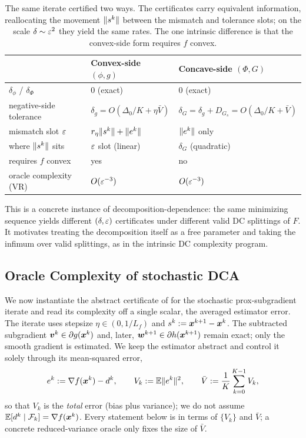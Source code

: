 \begin{table}[h]
\centering
\begin{tabular}{lll}
\toprule
 & Convex-side $(\phi,g)$ & Concave-side $(\Phi,G)$ \\
\midrule
$\delta_\phi$ / $\delta_\Phi$ & $0$ (exact) & $0$ (exact) \\
negative-side tolerance & $\delta_g=O(\Delta_0/K+\eta\bar V)$ & $\delta_G=\delta_g+D_{G_s}=O(\Delta_0/K+\bar V)$ \\
mismatch slot $\varepsilon$ & $r_\eta\lVert s^k\rVert+\lVert e^k\rVert$ & $\lVert e^k\rVert$ only \\
where $\lVert s^k\rVert$ sits & $\varepsilon$ slot (linear) & $\delta_G$ (quadratic) \\
requires $f$ convex & yes & no \\
oracle complexity (VR) & $O(\varepsilon^{-3})$ & $O(\varepsilon^{-3})$ \\
\bottomrule
\end{tabular}
\caption{The same iterate certified two ways. The certificates carry
equivalent information, reallocating the movement $\lVert s^k\rVert$ between the
mismatch and tolerance slots; on the scale $\delta\sim\varepsilon^2$ they yield
the same rates. The one intrinsic difference is that the convex-side form
requires $f$ convex.}
\end{table}

\begin{remark}
This is a concrete instance of decomposition-dependence: the same
minimizing sequence yields different $(\delta,\varepsilon)$ certificates
under different valid DC splittings of $F$. It motivates treating the
decomposition itself as a free parameter and taking the infimum over
valid splittings, as in the intrinsic DC complexity program.
\end{remark}

\subsection{Oracle Complexity of stochastic DCA}
We now instantiate the abstract certificate of
 for the stochastic prox-subgradient
iterate and read its complexity off a single scalar, the averaged
estimator error. The iterate uses stepsize $\eta\in(0,1/L_f)$ and $s^k:=\bm{x}^{k+1}-\bm{x}^k$. The
subtracted subgradient $\bm{v}^k\in\partial g(\bm{x}^k)$ and, later,
$\bm{w}^{k+1}\in\partial h(\bm{x}^{k+1})$ remain exact; only the smooth
gradient is estimated. We keep the estimator abstract and control it
solely through its mean-squared error,
\begin{equation}
    e^k:=\nabla f(\bm{x}^k)-d^k,
    \qquad
    V_k:=\mathbb{E}\lVert e^k\rVert^2,
    \qquad
    \bar V:=\frac1K\sum_{k=0}^{K-1}V_k,
    \label{eq:stoch-ps-dca-variance}
\end{equation}
so that $V_k$ is the \emph{total} error (bias plus variance); we do not
assume $\mathbb{E}[d^k\mid\mathcal{F}_k]=\nabla f(\bm{x}^k)$. Every statement below is in
terms of $\{V_k\}$ and $\bar V$; a concrete reduced-variance oracle only
fixes the size of $\bar V$.

